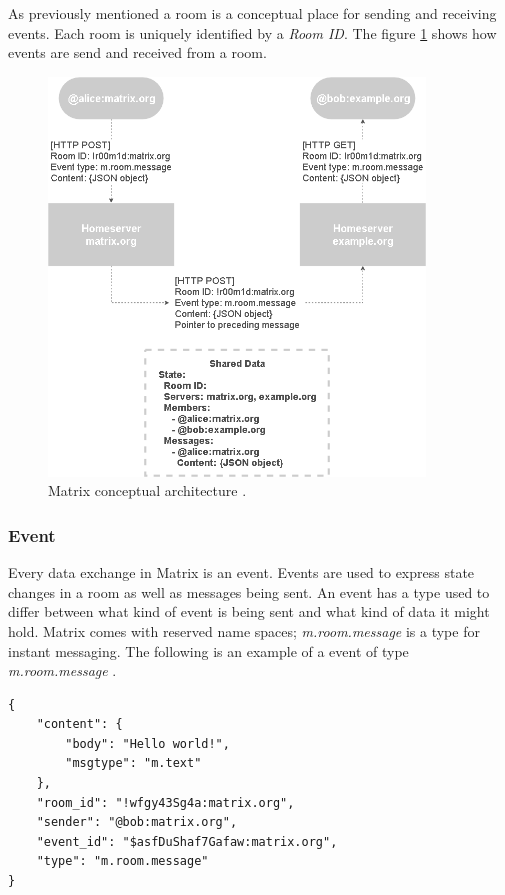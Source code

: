 As previously mentioned a room is a conceptual place for sending and receiving events. Each room is uniquely identified by a \emph{Room ID}. The figure \ref{fig:matrix_room} shows how events are send and received from a room.



\begin{figure}[H]
	\centering
	\includegraphics[width=10cm]{figures/matrix_room.png}
	\caption{ Matrix conceptual architecture \cite{matrixspec}.}
	\label{fig:matrix_room}
\end{figure}

\subsubsection{Event}

Every data exchange in Matrix is an event. Events are used to express state changes in a room as well as messages being sent. An event has a type used to differ between what kind of event is being sent and what kind of data it might hold. Matrix comes with reserved name spaces; \emph{m.room.message} is a type for instant messaging. The following is an example of a event of type \emph{m.room.message} \cite{matrixspec}.


\begin{lstlisting}[style=json]
{
	"content": {
		"body": "Hello world!",
		"msgtype": "m.text"
	},
	"room_id": "!wfgy43Sg4a:matrix.org",
	"sender": "@bob:matrix.org",
	"event_id": "$asfDuShaf7Gafaw:matrix.org",
	"type": "m.room.message"
}
\end{lstlisting}

